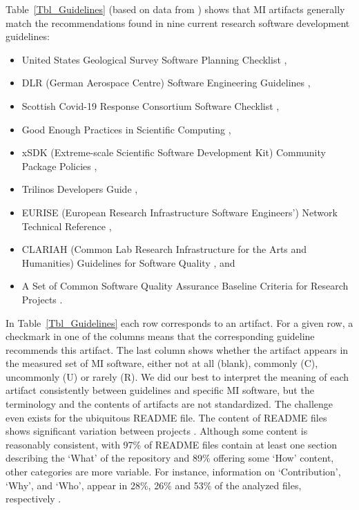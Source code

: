 \documentclass[11pt]{article}
\begin{document}
Table~\ref{Tbl_Guidelines} (based on data from \cite{SmithAndMichalski2022})
shows that MI artifacts generally match the recommendations found in nine
current research software development guidelines:
\begin{itemize}
\item United States Geological Survey Software Planning Checklist
\cite{USGS2019},
\item DLR (German Aerospace Centre) Software Engineering Guidelines
\cite{TobiasEtAl2018}, 
\item Scottish Covid-19 Response Consortium Software Checklist
\cite{BrettEtAl2021},
\item Good Enough Practices in Scientific Computing \cite{WilsonEtAl2016},
\item xSDK (Extreme-scale Scientific Software Development Kit) Community Package
Policies \cite{SmithAndRoscoe2018},
\item Trilinos Developers Guide \cite{HerouxEtAl2008},
\item EURISE (European Research Infrastructure Software Engineers') Network
Technical Reference \cite{ThielEtAl2020},
\item CLARIAH (Common Lab Research Infrastructure for the Arts and Humanities)
Guidelines for Software Quality \cite{vanGompelEtAl2016}, and
\item A Set of Common Software Quality Assurance Baseline Criteria for Research
Projects \cite{OrvizEtAl2017}.
\end{itemize}

In Table~\ref{Tbl_Guidelines} each row corresponds to an artifact.  For a given
row, a checkmark in one of the columns means that the corresponding guideline
recommends this artifact.  The last column shows whether the artifact appears in
the measured set of MI software, either not at all (blank), commonly (C),
uncommonly (U) or rarely (R).  We did our best to interpret the meaning of each
artifact consistently between guidelines and specific MI software, but the
terminology and the contents of artifacts are not standardized.  The challenge
even exists for the ubiquitous README file.  The content of README files shows
significant variation between projects \cite{PranaEtAl2018}.  Although some
content is reasonably consistent, with 97\% of README files contain at least one
section describing the `What' of the repository and 89\% offering some `How'
content, other categories are more variable.  For instance, information on
`Contribution', `Why', and `Who', appear in 28\%, 26\% and 53\% of the analyzed
files, respectively \cite{PranaEtAl2018}.  
\end{document}
